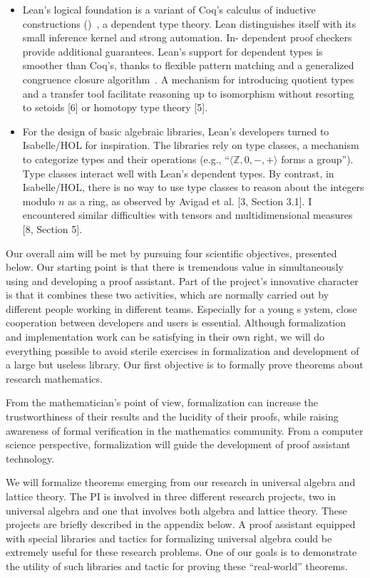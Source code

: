 \documentclass[12pt]{amsart}  %
\begin{document}
\begin{itemize}
\item Lean's logical foundation is a variant of Coq's calculus of inductive constructions (\cic)~\cite{MR935892}, a dependent type theory. Lean distinguishes itself with its small inference kernel and strong automation. In-
dependent proof checkers provide additional guarantees. Lean's support for dependent types
is smoother than Coq's, thanks to flexible pattern matching and a generalized congruence 
closure algorithm~\cite{MR3536762}. A mechanism for introducing quotient types and a transfer tool facilitate
reasoning up to isomorphism without resorting to setoids [6] or homotopy type theory [5].
\item For the design of basic algebraic libraries, Lean's developers turned to Isabelle/HOL for
  inspiration. The libraries rely on type classes, a mechanism to categorize types and their operations
(e.g., ``$\langle \mathbb Z, 0, -, +\rangle$ forms a group''). Type classes interact well with Lean's dependent types. By contrast, in Isabelle/HOL, there is no way to use type classes to reason about the integers modulo $n$
as a ring, as observed by Avigad et al. [3, Section 3.1]. I encountered similar difficulties with
tensors and multidimensional measures [8, Section 5].
\end{itemize}

Our overall aim will be met by pursuing four scientific objectives, presented below. Our starting
point is that there is tremendous value in simultaneously using and developing a proof assistant.
Part of the project's innovative character is that it combines these two activities, which are
normally carried out by different people working in different teams. Especially for a young s
ystem, close cooperation between developers and users is essential. Although formalization and
implementation work can be satisfying in their own right, we will do everything possible to
avoid sterile exercises in formalization and development of a large but useless library.
Our first objective is to formally prove theorems about research mathematics.

From the mathematician's point of view, formalization can increase the trustworthiness of their
results and the lucidity of their proofs, while raising awareness of formal verification in
the mathematics community. From a computer science perspective, formalization will guide
the development of proof assistant technology.

We will formalize theorems emerging from our research in universal algebra and lattice theory.
The PI is involved in three different research projects, two in universal algebra and one
that involves both algebra and lattice theory.  These projects are briefly
described in the appendix below. A proof assistant
equipped with special libraries and tactics for formalizing universal algebra
could be extremely useful for these research problems. One of our goals is to demonstrate
the utility of such libraries and tactic for proving these ``real-world'' theorems.
\end{document}
